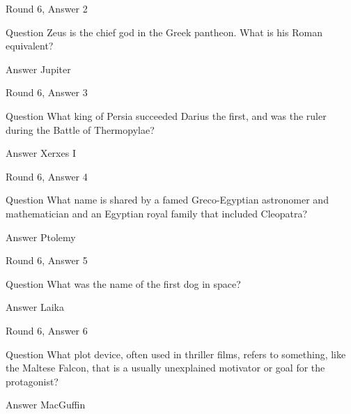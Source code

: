 \documentclass[11pt]{beamer}
\begin{document}
\begin{frame}{Round 6, Answer 2}
\begin{block}{Question}
Zeus is the chief god in the Greek pantheon. What is his Roman equivalent\@?
\end{block}
\pause{}
\begin{block}{Answer}
Jupiter
\end{block}
\end{frame}
    

\begin{frame}{Round 6, Answer 3}
\begin{block}{Question}
What king of Persia succeeded Darius the first, and was the ruler during the Battle of Thermopylae\@?
\end{block}
\pause{}
\begin{block}{Answer}
Xerxes I
\end{block}
\end{frame}
    

\begin{frame}{Round 6, Answer 4}
\begin{block}{Question}
What name is shared by a famed Greco-Egyptian astronomer and mathematician and an Egyptian royal family that included Cleopatra\@?
\end{block}
\pause{}
\begin{block}{Answer}
Ptolemy
\end{block}
\end{frame}
    

\begin{frame}{Round 6, Answer 5}
\begin{block}{Question}
What was the name of the first dog in space\@?
\end{block}
\pause{}
\begin{block}{Answer}
Laika
\end{block}
\end{frame}
    

\begin{frame}{Round 6, Answer 6}
\begin{block}{Question}
What plot device, often used in thriller films, refers to something, like the Maltese Falcon, that is a usually unexplained motivator or goal for the protagonist\@?
\end{block}
\pause{}
\begin{block}{Answer}
MacGuffin
\end{block}
\end{frame}
    
\end{document}

